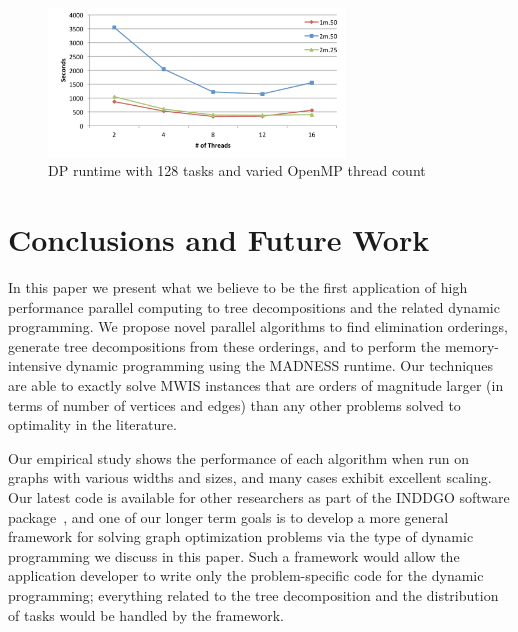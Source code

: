 \documentclass[conference]{IEEEtran}
\begin{document}
\begin{figure}[!ht]
\includegraphics[angle=0,width=3.1in]{figures/fig12_col.pdf}
\caption{DP runtime with 128 tasks and varied OpenMP thread count}
\label{fig:thread_scale}
\end{figure}

\section{Conclusions and Future Work}
In this paper we present what we believe to be the first application of high performance
 parallel computing to tree decompositions and the related dynamic programming.
We propose novel parallel
algorithms to find elimination orderings, generate tree decompositions from these orderings, and to perform
the memory-intensive dynamic programming using the MADNESS
runtime. Our techniques are able to exactly solve MWIS instances that are
orders of magnitude larger (in terms of number of vertices and edges) than any other problems solved 
to optimality in the
literature.  


Our empirical study shows the performance of each algorithm when run on graphs
with various widths and sizes, and many cases exhibit excellent scaling.
Our latest code is available for other researchers as part of the INDDGO software package~\cite{inddgo},
and one of our longer term
goals is to develop a more general framework for solving graph optimization
problems via the type of dynamic programming we discuss in this paper.
Such a framework would allow the application developer to
write only the problem-specific code for the dynamic programming; everything related
to the tree decomposition and the distribution of tasks would be handled by
the framework.

%
\end{document}
